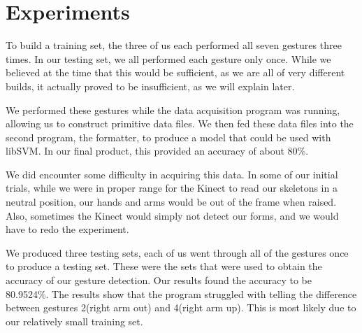 \documentclass[11pt,conference]{IEEEtran}
\begin{document}
\section{Experiments}
To build a training set, the three of us each performed all seven gestures three times. In our testing set, we all performed each gesture only once. While we believed at the time that this would be sufficient, as we are all of very different builds, it actually proved to be insufficient, as we will explain later.

We performed these gestures while the data acquisition program was running, allowing us to construct primitive data files. We then fed these data files into the second program, the formatter, to produce a model that could be used with libSVM. In our final product, this provided an accuracy of about 80\%.

We did encounter some difficulty in acquiring this data. In some of our initial trials, while we were in proper range for the Kinect to read our skeletons in a neutral position, our hands and arms would be out of the frame when raised. Also, sometimes the Kinect would simply not detect our forms, and we would have to redo the experiment.

We produced three testing sets, each of us went through all of the gestures once to produce a testing set. These were the sets that were used to obtain the accuracy of our gesture detection. Our results found the accuracy to be 80.9524\%. The results show that the program struggled with telling the difference between gestures 2(right arm out) and 4(right arm up). This is most likely due to our relatively small training set.
\end{document}
